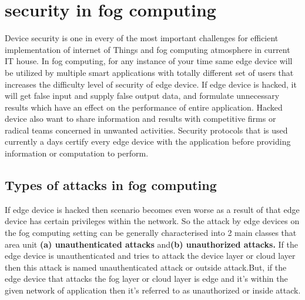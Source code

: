 \section{security in fog computing}
Device security is one in every of the most important challenges for efficient implementation of internet of Things and fog computing atmosphere in current IT house. In fog computing, for any instance of your time same edge device will be utilized by multiple smart applications with totally different set of users that increases the difficulty level of security of edge device. If edge device is hacked, it will get false input and supply false output data, and formulate unnecessary results which  have an effect on the performance of entire application. Hacked device also  want to share information and results with competitive firms or radical teams concerned in unwanted activities. Security protocols that is used currently a days certify every edge device with the application before providing information or computation to perform.

\subsection*{Types of attacks in fog computing}
 If edge device is hacked then scenario becomes even worse as a result of that edge device has certain privileges within the network. So the attack by edge devices on the fog computing setting can be generally characterised into 2 main classes that area unit \textbf{(a) unauthenticated attacks} and\textbf{(b) unauthorized attacks.} If the edge device is unauthenticated and tries to attack the device layer or cloud layer then this attack is named unauthenticated attack or outside attack.But, if the edge device that attacks the fog layer or cloud layer is edge and it's within the given network of application then it's referred to as unauthorized or inside attack.
